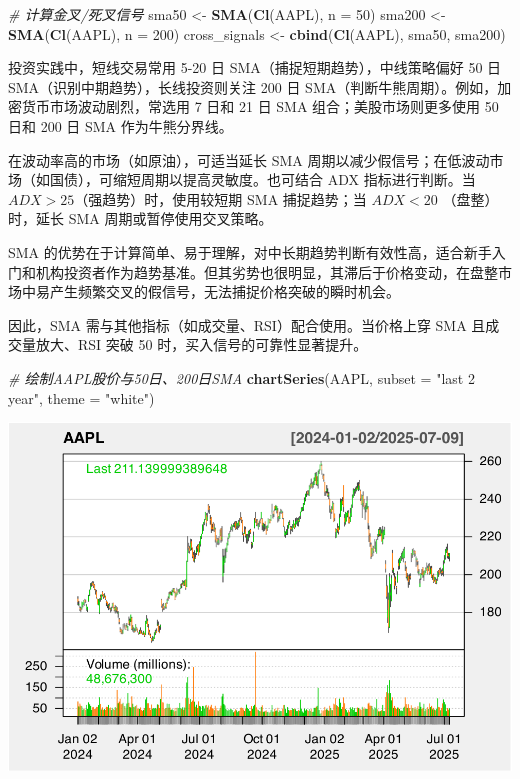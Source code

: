 \documentclass[]{ctexbook}
\newenvironment{Shaded}{\begin{snugshade}}{\end{snugshade}}
\newcommand{\AttributeTok}[1]{\textcolor[rgb]{0.13,0.29,0.53}{#1}}
\newcommand{\CommentTok}[1]{\textcolor[rgb]{0.56,0.35,0.01}{\textit{#1}}}
\newcommand{\DecValTok}[1]{\textcolor[rgb]{0.00,0.00,0.81}{#1}}
\newcommand{\FunctionTok}[1]{\textcolor[rgb]{0.13,0.29,0.53}{\textbf{#1}}}
\newcommand{\NormalTok}[1]{#1}
\newcommand{\OtherTok}[1]{\textcolor[rgb]{0.56,0.35,0.01}{#1}}
\newcommand{\StringTok}[1]{\textcolor[rgb]{0.31,0.60,0.02}{#1}}
\begin{document}
\begin{Shaded}
\begin{Highlighting}[]
\CommentTok{\# 计算金叉/死叉信号}
\NormalTok{sma50 }\OtherTok{\textless{}{-}} \FunctionTok{SMA}\NormalTok{(}\FunctionTok{Cl}\NormalTok{(AAPL), }\AttributeTok{n =} \DecValTok{50}\NormalTok{)}
\NormalTok{sma200 }\OtherTok{\textless{}{-}} \FunctionTok{SMA}\NormalTok{(}\FunctionTok{Cl}\NormalTok{(AAPL), }\AttributeTok{n =} \DecValTok{200}\NormalTok{)}
\NormalTok{cross\_signals }\OtherTok{\textless{}{-}} \FunctionTok{cbind}\NormalTok{(}\FunctionTok{Cl}\NormalTok{(AAPL), sma50, sma200)}
\end{Highlighting}
\end{Shaded}

投资实践中，短线交易常用 5-20 日 SMA（捕捉短期趋势），中线策略偏好 50 日 SMA（识别中期趋势），长线投资则关注 200 日 SMA（判断牛熊周期）。例如，加密货币市场波动剧烈，常选用 7 日和 21 日 SMA 组合；美股市场则更多使用 50 日和 200 日 SMA 作为牛熊分界线。

在波动率高的市场（如原油），可适当延长 SMA 周期以减少假信号；在低波动市场（如国债），可缩短周期以提高灵敏度。也可结合 ADX 指标进行判断。当 \(ADX > 25\)（强趋势）时，使用较短期 SMA 捕捉趋势；当
\(ADX<20\) （盘整）时，延长 SMA 周期或暂停使用交叉策略。

SMA 的优势在于计算简单、易于理解，对中长期趋势判断有效性高，适合新手入门和机构投资者作为趋势基准。但其劣势也很明显，其滞后于价格变动，在盘整市场中易产生频繁交叉的假信号，无法捕捉价格突破的瞬时机会。

因此，SMA 需与其他指标（如成交量、RSI）配合使用。当价格上穿 SMA 且成交量放大、RSI 突破 50 时，买入信号的可靠性显著提升。

\begin{Shaded}
\begin{Highlighting}[]
\CommentTok{\# 绘制AAPL股价与50日、200日SMA}
\FunctionTok{chartSeries}\NormalTok{(AAPL, }\AttributeTok{subset =} \StringTok{"last 2 year"}\NormalTok{, }\AttributeTok{theme =} \StringTok{"white"}\NormalTok{)}
\end{Highlighting}
\end{Shaded}

\includegraphics[width=0.9\linewidth]{quantmod_files/figure-latex/sma_2-1}
\end{document}
